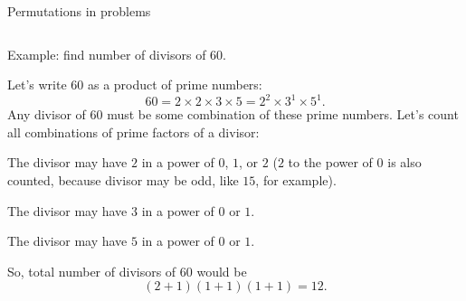 \documentclass[9pt,aspectratio=169]{beamer}
\begin{document}
\begin{frame}{Permutations in problems}
\begin{columns}[T]
\begin{column}{0.5\textwidth}
      \begin{problem}
        {\color{textBlue} Example:} find number of divisors of $60$.
      \end{problem}

      {\small
      Let’s write $60$ as a product of prime numbers:
      \[ 60 = 2 \times 2 \times 3 \times 5 = 2^2 \times 3^1 \times 5^1.\]
      Any divisor of $60$ must be some combination of these prime numbers. Let’s count all combinations of prime factors of a divisor:

      The divisor may have $2$ in a power of $0$, $1$, or $2$ ($2$ to the power of $0$ is also counted, because divisor may be odd, like $15$, for example).

      The divisor may have $3$ in a power of $0$ or $1$.

      The divisor may have $5$ in a power of $0$ or $1$.

      So, total number of divisors of $60$ would be
      \[(2 + 1) (1 + 1) (1 + 1) = 12.\]
      }
    \end{column}
  \end{columns}
\end{frame}
\end{document}
